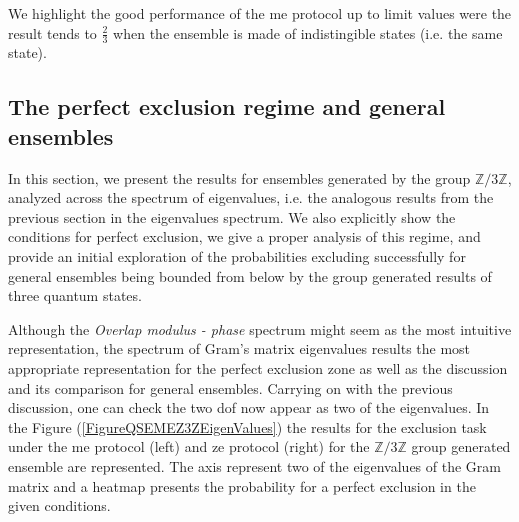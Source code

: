 \documentclass[12pt,letterpaper]{article}
\begin{document}

We highlight the good performance of the \gls{me} protocol up to limit values were the result tends to $\frac{2}{3}$ when the ensemble is made of indistingible states (i.e. the same state). 

\subsection{The perfect exclusion regime and general ensembles}\label{sectionPerfectExclusionRegimeAndGeneralEnsembles}

\hspace{20pt}In this section, we present the results for ensembles generated by the group $\mathbb{Z}/3\mathbb{Z}$, analyzed across the spectrum of eigenvalues, i.e. the analogous results from the previous section in the eigenvalues spectrum. We also explicitly show the conditions for perfect exclusion, we give a proper analysis of this regime, and provide an initial exploration of the probabilities excluding successfully for general ensembles being bounded from below by the group generated results of three quantum states.

Although the \emph{Overlap modulus - phase} spectrum might seem as the most intuitive representation, the spectrum of Gram's matrix eigenvalues results the most appropriate representation for the perfect exclusion zone as well as the discussion and its comparison for general ensembles. Carrying on with the previous discussion, one can check the two \gls{dof} now appear as two of the eigenvalues. In the Figure (\ref{FigureQSEMEZ3ZEigenValues}) the results for the exclusion task under the \gls{me} protocol (left) and \gls{ze} protocol (right) for the $\mathbb{Z}/3\mathbb{Z}$ group generated ensemble are represented. The axis represent two of the eigenvalues of the Gram matrix and a heatmap presents the probability for a perfect exclusion in the given conditions.
\end{document}
